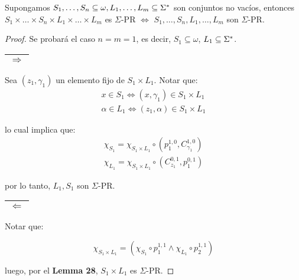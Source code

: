   \begin{lemma}
    \PN Supongamos $S_{1}, \dotsc, S_{n} \subseteq \omega, L_{1}, \dotsc, L_{m} \subseteq \Sigma^{\ast}$ son conjuntos no
    vacíos, entonces $S_{1} \times \dotsc \times S_{n} \times L_{1} \times \dotsc \times L_{m}$ es $\Sigma$-PR
    $\Leftrightarrow$ $S_{1}, \dotsc, S_{n}, L_{1}, \dotsc, L_{m}$ son $\Sigma$-PR.
  \end{lemma}
  \begin{proof}
    \PN Se probará el caso $n = m = 1$, es decir, $S_{1} \subseteq \omega$, $L_{1} \subseteq \Sigma^{\ast}$.

    \vspace{3mm}
    \PN \begin{tabular}{|c|} \hline $\Rightarrow$ \\\hline \end{tabular} Sea $(z_{1}, \gamma_{1})$ un elemento fijo de
    $S_{1} \times L_{1}$. Notar que:
    \begin{eqnarray*}
      x \in S_{1} \Leftrightarrow (x, \gamma_{1}) \in S_{1} \times L_{1} \\
      \alpha \in L_{1} \Leftrightarrow (z_{1}, \alpha) \in S_{1} \times L_{1}
    \end{eqnarray*}

    \PN lo cual implica que:
    \begin{eqnarray*}
      \chi_{S_{1}} = \chi_{S_{1} \times L_{1}} \circ \left(p_{1}^{1,0}, C_{\gamma_{1}}^{1,0}\right) \\
      \chi_{L_{1}} = \chi_{S_{1} \times L_{1}} \circ \left(C_{z_{1}}^{0,1}, p_{1}^{0,1}\right)
    \end{eqnarray*}

    \PN por lo tanto, $L_{1}, S_{1}$ son $\Sigma$-PR.

    \vspace{3mm}
    \PN \begin{tabular}{|c|} \hline $\Leftarrow$\\\hline \end{tabular} Notar que:

    \[
      \chi_{S_{1} \times L_{1}} = \left(\chi_{S_{1}} \circ p_{1}^{1,1} \wedge \chi_{L_{1}} \circ p_{2}^{1,1} \right)
    \]

    \PN luego, por el \textbf{Lemma 28}, $S_{1} \times L_{1}$ es $\Sigma$-PR.
  \end{proof}

